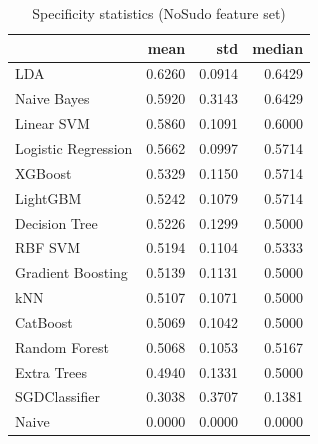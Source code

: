 \begin{table}
\caption{Specificity statistics (NoSudo feature set)}
\label{tab:specificity_NoSudo_stats}
\begin{tabular}{lrrr}
\toprule
 & mean & std & median \\
\midrule
LDA & 0.6260 & 0.0914 & 0.6429 \\
Naive Bayes & 0.5920 & 0.3143 & 0.6429 \\
Linear SVM & 0.5860 & 0.1091 & 0.6000 \\
Logistic Regression & 0.5662 & 0.0997 & 0.5714 \\
XGBoost & 0.5329 & 0.1150 & 0.5714 \\
LightGBM & 0.5242 & 0.1079 & 0.5714 \\
Decision Tree & 0.5226 & 0.1299 & 0.5000 \\
RBF SVM & 0.5194 & 0.1104 & 0.5333 \\
Gradient Boosting & 0.5139 & 0.1131 & 0.5000 \\
kNN & 0.5107 & 0.1071 & 0.5000 \\
CatBoost & 0.5069 & 0.1042 & 0.5000 \\
Random Forest & 0.5068 & 0.1053 & 0.5167 \\
Extra Trees & 0.4940 & 0.1331 & 0.5000 \\
SGDClassifier & 0.3038 & 0.3707 & 0.1381 \\
Naive & 0.0000 & 0.0000 & 0.0000 \\
\bottomrule
\end{tabular}
\end{table}
